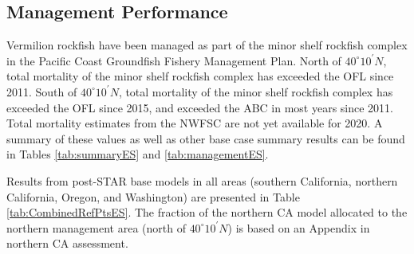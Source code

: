\documentclass[
  english,
  a4paper,
]{article}
\begin{document}
\FloatBarrier

\hypertarget{management-performance}{%
\subsection*{Management Performance}\label{management-performance}}

Vermilion rockfish have been managed as part of the minor shelf rockfish
complex in the Pacific Coast Groundfish Fishery Management Plan. North of $40^\circ 10^\prime N$,
total mortality of the minor shelf rockfish complex has exceeded the OFL since
2011. South of $40^\circ 10^\prime N$, total mortality of the minor shelf rockfish complex has
exceeded the OFL since 2015, and exceeded the ABC in most years since 2011.
Total mortality estimates from the NWFSC are not yet available for 2020.
A summary of these values as well as other base case summary results can be found
in Tables \ref{tab:summaryES} and \ref{tab:managementES}.

Results from post-STAR base models in all areas (southern California, northern
California, Oregon, and Washington) are presented in Table \ref{tab:CombinedRefPtsES}.
The fraction of the northern CA model allocated to the northern management area
(north of $40^\circ 10^\prime N$) is based on an Appendix in northern CA assessment.
\end{document}
